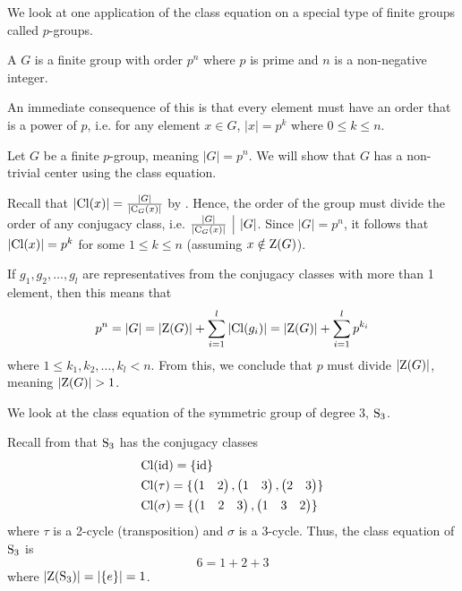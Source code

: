 We look at one application of the class equation on a special type of finite groups called $p$-groups.

\begin{definition}
    A  $G$ is a finite group with order $p^n$ where $p$ is prime and $n$ is a non-negative integer.
\end{definition}
An immediate consequence of this is that every element must have an order that is a power of $p$, i.e. for any element $x \in G$, $|x| = p^k$ where $0 \leq k \leq n$.

\begin{example}\label{example-group-with-prime-power-order-has-non-trivial-center}
    Let $G$ be a finite $p$-group, meaning $|G| = p^n$. We will show that $G$ has a non-trivial center using the class equation.

    Recall that $|\mathrm{Cl}(x)| = \frac{|G|}{|\mathrm{C}_{G}(x)|}$ by . Hence, the order of the group must divide the order of any conjugacy class, i.e. $\frac{|G|}{|\Centralizer{G}{x}|} \vert |G|$. Since $|G| = p^n$, it follows that $|\mathrm{Cl}(x)| = p^k$ for some $1 \leq k \leq n$ (assuming $x \notin \mathrm{Z}(G)$).

    If $g_1, g_2, \dots, g_l$ are representatives from the conjugacy classes with more than 1 element, then this means that
    \[
        p^n = |G| = |\mathrm{Z}(G)| + \sum_{i=1}^l |\mathrm{Cl}(g_i)| = |\mathrm{Z}(G)| + \sum_{i=1}^l p^{k_i}
    \]
    where $1 \leq k_1, k_2, \dots, k_l < n$. From this, we conclude that $p$ must divide $|\mathrm{Z}(G)|$, meaning $|\mathrm{Z}(G)| > 1$.
\end{example}

\begin{example}
    We look at the class equation of the symmetric group of degree 3, $\mathrm{S}_{3}$.

    Recall from  that $\mathrm{S}_{3}$ has the conjugacy classes
    \begin{align*}
        &\mathrm{Cl}(\mathrm{id}) = \{\mathrm{id}\}\\
        &\mathrm{Cl}(\tau) = \{\begin{pmatrix}1 & 2\end{pmatrix}, \begin{pmatrix}1 & 3\end{pmatrix}, \begin{pmatrix}2 & 3\end{pmatrix}\}\\
        &\mathrm{Cl}(\sigma) = \{\begin{pmatrix}1 & 2 & 3\end{pmatrix}, \begin{pmatrix}1 & 3 & 2\end{pmatrix}\}
    \end{align*}
    where $\tau$ is a 2-cycle (transposition) and $\sigma$ is a 3-cycle. Thus, the class equation of $\mathrm{S}_{3}$ is
    \[
        6 = 1 + 2 + 3
    \]
    where $|\mathrm{Z}(\mathrm{S}_{3})| = |\{e\}| = 1$.
\end{example}

